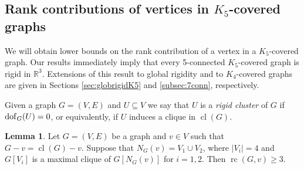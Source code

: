 \documentclass[11pt,a4paper]{article}
\theoremstyle{definition}
\newtheorem{lemma}[theorem]{Lemma}
\DeclareMathOperator{\rc}{rc}
\DeclareMathOperator{\cl}{cl}
\newcommand{\dof}{{\rm dof}}
\newcommand{\R}{\mathbb{R}}
\begin{document}
\subsection{Rank contributions of vertices in $K_5$-covered graphs}

We will obtain
lower bounds on the rank contribution of a
vertex in a $K_5$-covered graph. Our results immediately imply that every 5-connected $K_5$-covered graph is rigid in $\R^3$. Extensions of this result to global rigidity and to $K_4$-covered graphs are given in Sections \ref{sec:globrigidK5} and \ref{subsec:7conn}, respectively.

Given a graph $G=(V,E)$ and $U\subseteq V$ we say that $U$ is a {\em rigid cluster} of $G$ if $\dof_G(U)=0$, or equivalently, if $U$ induces a clique in $\cl(G)$.


\begin{lemma}\label{lem:rc:twocliques}
Let $G=(V,E)$ be a graph and $v\in V$ such that $G-v=\cl(G) -v$.
Suppose that $N_G(v)=V_1\cup V_2$, where
$|V_i|=4$ and $G[V_i]$ is a  maximal clique of $G[N_G(v)]$  for $i=1,2$.
Then $\rc(G,v)\geq 3$.
\end{lemma}
\end{document}
